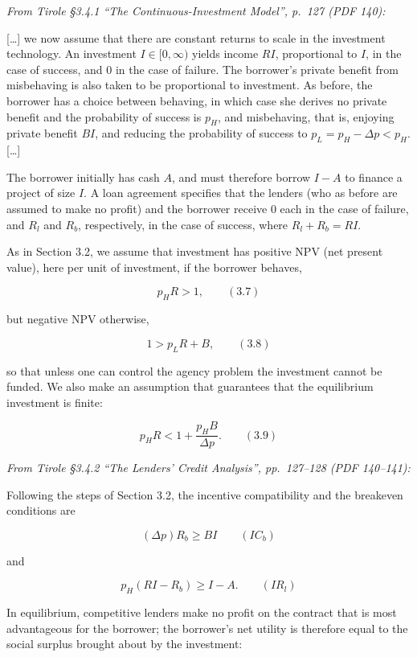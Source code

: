 \documentclass[11pt,a4paper]{article}
\begin{document}
\emph{From Tirole §3.4.1 ``The Continuous-Investment Model'', p.~127 (PDF 140):}

{[}\ldots{]} we now assume that there are constant returns to scale in the investment technology. An
investment \(I \in [0, \infty)\) yields income \(RI\), proportional to \(I\), in the case of
success, and 0 in the case of failure. The borrower's private benefit from misbehaving is also taken
to be proportional to investment. As before, the borrower has a choice between behaving, in which
case she derives no private benefit and the probability of success is \(p_H\), and misbehaving, that
is, enjoying private benefit \(BI\), and reducing the probability of success to
\(p_L = p_H - \Delta p < p_H\). {[}\ldots{]}

The borrower initially has cash \(A\), and must therefore borrow \(I - A\) to finance a project of
size \(I\). A loan agreement specifies that the lenders (who as before are assumed to make no
profit) and the borrower receive 0 each in the case of failure, and \(R_l\) and \(R_b\),
respectively, in the case of success, where \(R_l + R_b = RI\).

As in Section 3.2, we assume that investment has positive NPV (net present value), here per unit of
investment, if the borrower behaves,

\[p_H R > 1, \qquad (3.7)\]

but negative NPV otherwise,

\[1 > p_L R + B, \qquad (3.8)\]

so that unless one can control the agency problem the investment cannot be funded. We also make an
assumption that guarantees that the equilibrium investment is finite:

\[p_H R < 1 + \frac{p_H B}{\Delta p}. \qquad (3.9)\]

\emph{From Tirole §3.4.2 ``The Lenders' Credit Analysis'', pp.~127--128 (PDF 140--141):}

Following the steps of Section 3.2, the incentive compatibility and the breakeven conditions are

\[(\Delta p)R_b \geqslant BI \qquad (IC_b)\]

and

\[p_H(RI - R_b) \geqslant I - A. \qquad (IR_l)\]

In equilibrium, competitive lenders make no profit on the contract that is most advantageous for the
borrower; the borrower's net utility is therefore equal to the social surplus brought about by the
investment:
\end{document}
